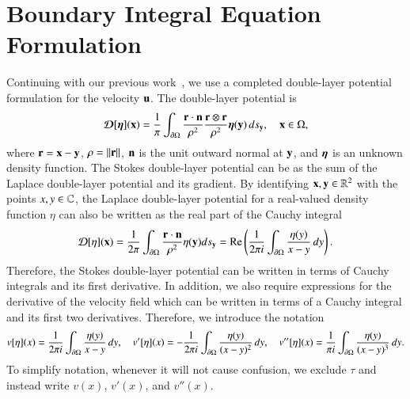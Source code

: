 \documentclass[preprint, 10pt]{elsarticle}
\begin{document}
\section{Boundary Integral Equation Formulation}
\label{s:formulation}
Continuing with our previous work~\cite{qua-moo2018}, we use a completed
double-layer potential formulation for the velocity ${\mathbf{u}}$.  The
double-layer potential is
\begin{align}
  {\boldsymbol{\mathcal D}}[{\boldsymbol\eta}]({\mathbf{x}}) = \frac{1}{\pi}\int_{{\partial}\Omega} 
    \frac{{\mathbf{r}} \cdot {\mathbf{n}}}{\rho^2} \frac{{\mathbf{r}} \otimes {\mathbf{r}}}{\rho^2}
    {\boldsymbol\eta}({\mathbf{y}}) \, ds_{\mathbf{y}}, \quad {\mathbf{x}} \in \Omega,
  \label{eqn:stokesDLP}
\end{align}
where ${\mathbf{r}} = {\mathbf{x}} - {\mathbf{y}}$, $\rho = \|{\mathbf{r}}\|$, ${\mathbf{n}}$ is the unit outward
normal at ${\mathbf{y}}$, and ${\boldsymbol\eta}$ is an unknown density function.  The Stokes
double-layer potential can be as the sum of the Laplace double-layer
potential and its gradient.  By identifying ${\mathbf{x}},{\mathbf{y}} \in {\mathbb{R}}^2$ with the
points $x,y \in {\mathbb{C}}$, the Laplace double-layer potential for a
real-valued density function $\eta$ can also be written as the real part
of the Cauchy integral
\begin{align}
  {\mathcal{D}}[\eta]({\mathbf{x}}) = \frac{1}{2\pi} \int_{{\partial}\Omega}
    \frac{{\mathbf{r}} \cdot {\mathbf{n}}}{\rho^2} \eta({\mathbf{y}}) ds_{\mathbf{y}} = 
  {\operatorname{Re}} \left( \frac{1}{2\pi i} \int_{{\partial}\Omega}
    \frac{\eta(y)}{x - y} \, dy \right).
\end{align}
Therefore, the Stokes double-layer potential can be written in terms of
Cauchy integrals and its first derivative.  In addition, we also require
expressions for the derivative of the velocity field which can be
written in terms of a Cauchy integral and its first two derivatives.
Therefore, we introduce the notation
\begin{align}
  \label{eqn:cauchy}
  v[\eta](x) = \frac{1}{2\pi i} \int_{{\partial}\Omega}
    \frac{\eta(y)}{x - y} \, dy,  \quad
  v'[\eta](x) = -\frac{1}{2\pi i} \int_{{\partial}\Omega}
    \frac{\eta(y)}{(x - y)^2} \, dy, \quad
  v''[\eta](x) = \frac{1}{\pi i} \int_{{\partial}\Omega}
    \frac{\eta(y)}{(x - y)^3} \, dy.
\end{align}
To simplify notation, whenever it will not cause confusion, we exclude
$\tau$ and instead write $v(x)$, $v'(x)$, and $v''(x)$.
\end{document}
